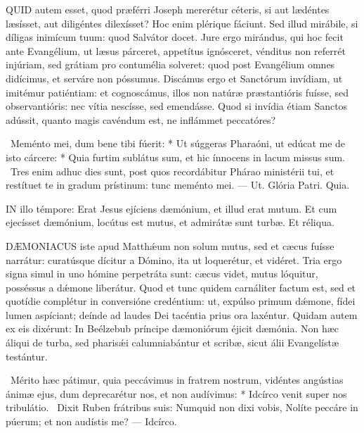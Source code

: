 
\lettrine[lines=2]{Q}{UID} autem esset, quod præférri Joseph mererétur céteris, si aut lædéntes læsísset, aut diligéntes dilexísset? Hoc enim plérique fáciunt. Sed illud mirábile, si díligas inimícum tuum: quod Salvátor docet. Jure ergo mirándus, qui hoc fecit ante Evangélium, ut læsus párceret, appetítus ignósceret, vénditus non referrét injúriam, sed grátiam pro contumélia solveret: quod post Evangélium omnes didícimus, et serváre non póssumus. Discámus ergo et Sanctórum invídiam, ut imitémur patiéntiam: et cognoscámus, illos non natúræ præstantióris fuísse, sed observantióris: nec vítia nescísse, sed emendásse. Quod si invídia étiam Sanctos adússit, quanto magis cavéndum est, ne inflámmet peccatóres?

\R\ Meménto mei, dum bene tibi fúerit: * Ut súggeras Pharaóni, ut edúcat me de isto cárcere: * Quia furtim sublátus sum, et hic ínnocens in lacum missus sum. \V\ Tres enim adhuc dies sunt, post quos recordábitur Phárao ministérii tui, et restítuet te in gradum prístinum: tunc meménto mei. --- Ut. Glória Patri. Quia.




\lettrine[lines=2]{I}{N} illo témpore: Erat Jesus ejíciens dæmónium, et illud erat mutum. Et cum ejecísset dæmónium, locútus est mutus, et admirátæ sunt turbæ. Et réliqua.



\lettrine[lines=2]{D}{ÆMONIACUS} iste apud Matthǽum non solum mutus, sed et cæcus fuísse narrátur: curatúsque dícitur a Dómino, ita ut loquerétur, et vidéret. Tria ergo signa simul in uno hómine perpetráta sunt: cæcus videt, mutus lóquitur, posséssus a dǽmone liberátur. Quod et tunc quidem carnáliter factum est, sed et quotídie complétur in conversióne credéntium: ut, expúlso primum dǽmone, fídei lumen aspíciant; deínde ad laudes Dei tacéntia prius ora laxéntur. Quidam autem ex eis dixérunt: In Beélzebub príncipe dæmoniórum éjicit dæmónia. Non hæc áliqui de turba, sed pharisǽi calumniabántur et scribæ, sicut álii Evangelístæ testántur.

\R\ Mérito hæc pátimur, quia peccávimus in fratrem nostrum, vidéntes angústias ánimæ ejus, dum deprecarétur nos, et non audívimus: * Idcírco venit super nos tribulátio. \V\ Dixit Ruben frátribus suis: Numquid non dixi vobis, Nolíte peccáre in púerum; et non audístis me? --- Idcírco.

